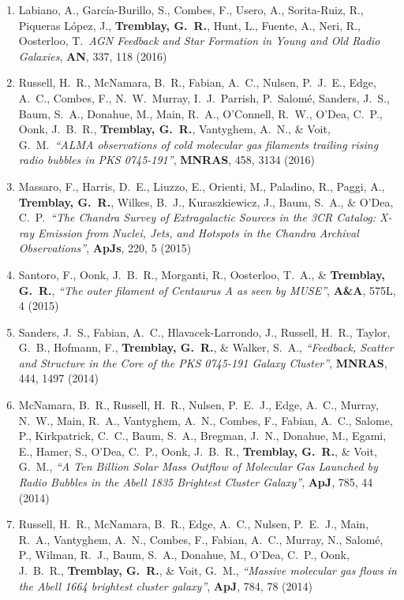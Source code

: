 \documentclass[11pt]{article}
\begin{document}
\begin{enumerate}[resume]
\item Labiano, A., Garc\'{i}a-Burillo, S., Combes, F., Usero, A., Sorita-Ruiz, R., Piqueras L\'{o}pez, J., \textbf{Tremblay, G.~R.}, Hunt, L., Fuente, A., Neri, R.,
Oosterloo, T.\ \textit{AGN Feedback and Star Formation in Young and Old Radio Galaxies}, \textbf{AN}, 337, 118 (2016)

\item Russell, H.~R., McNamara, B.~R., Fabian, A.~C., Nulsen, P.~J.~E., Edge, A.~C., Combes, F., N.~W.~Murray, I.~J.~Parrish, P.~Salom\'{e}, Sanders, J.~S., Baum, S.~A., Donahue, M., Main, R.~A.,
O'Connell, R.~W., O'Dea, C.~P., Oonk, J.~B.~R., \textbf{Tremblay, G.~R.}, Vantyghem, A.~N., \& Voit, G.~M.\ \textit{``ALMA observations of cold molecular gas filaments trailing rising radio bubbles in PKS 0745-191''}, \textbf{MNRAS}, 458, 3134 (2016)


\item Massaro, F., Harris, D.~E., Liuzzo, E., Orienti, M., Paladino, R., Paggi, A., \textbf{Tremblay, G.~R.}, Wilkes, B.~J., Kuraszkiewicz, J., Baum, S.~A., \& O'Dea, C.~P.\ \textit{``The Chandra Survey of Extragalactic Sources in the 3CR Catalog: X-ray Emission from Nuclei, Jets, and Hotspots in the Chandra Archival Observations''}, \textbf{ApJs}, 220, 5 (2015)


\item Santoro, F., Oonk, J.~B.~R., Morganti, R., Oosterloo, T.~A., \& \textbf{Tremblay, G.~R.},  \textit{``The outer filament of Centaurus A as seen by MUSE''}, \textbf{A\&A}, 575L, 4 (2015)


\item Sanders, J.~S., Fabian, A.~C., Hlavacek-Larrondo, J., Russell, H.~R., Taylor, G.~B., Hofmann, F., \textbf{Tremblay, G.~R.}, \& Walker, S.~A.,  \textit{``Feedback, Scatter and Structure in the Core of the PKS 0745-191 Galaxy Cluster''}, \textbf{MNRAS}, 444, 1497 (2014)


\item McNamara, B.~R., Russell, H.~R., Nulsen, P.~E.~J., Edge, A.~C., Murray,
N.~W., Main, R.~A., Vantyghem, A.~N., Combes, F., Fabian, A.~C., Salome,
P., Kirkpatrick, C.~C., Baum, S.~A., Bregman, J.~N., Donahue, M., Egami,
E., Hamer, S., O'Dea, C.~P., Oonk, J.~B.~R., \textbf{Tremblay, G.~R.},
\& Voit, G.~M., \textit{``A Ten Billion Solar Mass Outflow of Molecular Gas Launched by Radio Bubbles in the Abell 1835 Brightest Cluster Galaxy''}, \textbf{ApJ}, 785, 44 (2014)


\item Russell, H.~R., McNamara, B.~R., Edge, A.~C., Nulsen, P.~E.~J., Main,
R.~A., Vantyghem, A.~N., Combes, F., Fabian, A.~C., Murray, N., Salom\'{e}, P.,
Wilman, R.~J., Baum, S.~A., Donahue, M., O'Dea, C.~P., Oonk, J.~B.~R.,
\textbf{Tremblay, G.~R.},
\& Voit, G.~M.,  \textit{``Massive molecular gas flows in the Abell 1664 brightest cluster galaxy''}, \textbf{ApJ}, 784, 78 (2014)




\end{enumerate}
\end{document}

